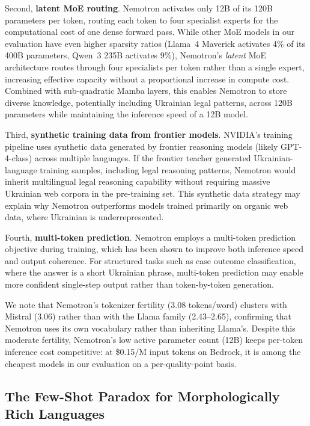 \documentclass[11pt,a4paper]{article}
\begin{document}
Second, \textbf{latent MoE routing}. Nemotron activates only 12B of its 120B parameters per token, routing each token to four specialist experts for the computational cost of one dense forward pass. While other MoE models in our evaluation have even higher sparsity ratios (Llama~4 Maverick activates 4\% of its 400B parameters, Qwen~3 235B activates 9\%), Nemotron's \emph{latent} MoE architecture routes through four specialists per token rather than a single expert, increasing effective capacity without a proportional increase in compute cost. Combined with sub-quadratic Mamba layers, this enables Nemotron to store diverse knowledge, potentially including Ukrainian legal patterns, across 120B parameters while maintaining the inference speed of a 12B model.

Third, \textbf{synthetic training data from frontier models}. NVIDIA's training pipeline uses synthetic data generated by frontier reasoning models (likely GPT-4-class) across multiple languages. If the frontier teacher generated Ukrainian-language training samples, including legal reasoning patterns, Nemotron would inherit multilingual legal reasoning capability without requiring massive Ukrainian web corpora in the pre-training set. This synthetic data strategy may explain why Nemotron outperforms models trained primarily on organic web data, where Ukrainian is underrepresented.

Fourth, \textbf{multi-token prediction}. Nemotron employs a multi-token prediction objective during training, which has been shown to improve both inference speed and output coherence. For structured tasks such as case outcome classification, where the answer is a short Ukrainian phrase, multi-token prediction may enable more confident single-step output rather than token-by-token generation.

We note that Nemotron's tokenizer fertility (3.08 tokens/word) clusters with Mistral (3.06) rather than with the Llama family (2.43--2.65), confirming that Nemotron uses its own vocabulary rather than inheriting Llama's. Despite this moderate fertility, Nemotron's low active parameter count (12B) keeps per-token inference cost competitive: at \$0.15/M input tokens on Bedrock, it is among the cheapest models in our evaluation on a per-quality-point basis.

\subsection{The Few-Shot Paradox for Morphologically Rich Languages}
\end{document}
